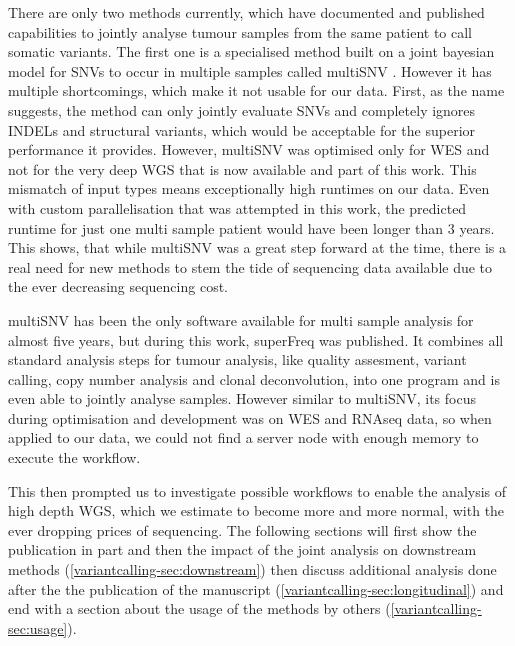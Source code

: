 There are only two methods currently, which have documented and published capabilities to jointly analyse tumour samples from the same patient to call somatic variants. The first one is a specialised method built on a joint bayesian model for SNVs to occur in multiple samples called multiSNV \cite{Josephidou2015}. However it has multiple shortcomings, which make it not usable for our data. First, as the name suggests, the method can only jointly evaluate SNVs and completely ignores INDELs and structural variants, which would be acceptable for the superior performance it provides. However, multiSNV was optimised only for WES and not for the very deep WGS that is now available and part of this work. This mismatch of input types means exceptionally high runtimes on our data. Even with custom parallelisation that was attempted in this work, the predicted runtime for just one multi sample patient would have been longer than 3 years. This shows, that while multiSNV was a great step forward at the time, there is a real need for new methods to stem the tide of sequencing data available due to the ever decreasing sequencing cost.

multiSNV has been the only software available for multi sample analysis for almost five years, but during this work, superFreq \cite{Flensburg2020} was published. It combines all standard analysis steps for tumour analysis, like quality assesment, variant calling, copy number analysis and clonal deconvolution, into one program and is even able to jointly analyse samples. However similar to multiSNV, its focus during optimisation and development was on WES and RNAseq data, so when applied to our data, we could not find a server node with enough memory to execute the workflow.

This then prompted us to investigate possible workflows to enable the analysis of high depth WGS, which we estimate to become more and more normal, with the ever dropping prices of sequencing. The following sections will first show the publication in part and then the impact of the joint analysis on downstream methods (\autoref{variantcalling-sec:downstream}) then discuss additional analysis done after the the publication of the manuscript (\autoref{variantcalling-sec:longitudinal}) and end with a section about the usage of the methods by others (\autoref{variantcalling-sec:usage}).

